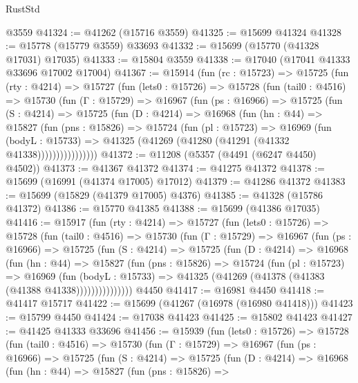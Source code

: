 \begin{lexlean}{RustStd}
\begin{coremodule}
    @3559
@41324 := @41262 (@15716 @3559)
@41325 := @15699 @41324
@41328 := @15778 (@15779 @3559) @33693
@41332 := @15699 (@15770 (@41328 @17031) @17035)
@41333 := @15804 @3559
@41338 := @17040 (@17041 @41333 @33696 @17002 @17004)
@41367 := @15914
    (fun (rc : @15723) =>
    @15725
      (fun (rty : @4214) =>
      @15727
        (fun (lets0 : @15726) =>
        @15728
          (fun (tail0 : @4516) =>
          @15730
            (fun (Γ : @15729) =>
            @16967
              (fun (ps : @16966) =>
              @15725
                (fun (S : @4214) =>
                @15725
                  (fun (D : @4214) =>
                  @16968
                    (fun (hn : @44) =>
                    @15827
                      (fun (pns : @15826) =>
                      @15724
                        (fun (pl : @15723) =>
                        @16969
                          (fun (bodyL : @15733) =>
                          @41325 (@41269 (@41280 (@41291 (@41332 @41338))))))))))))))))
@41372 := @11208 (@5357 (@4491 (@6247 @4450) @4502))
@41373 := @41367 @41372
@41374 := @41275 @41372
@41378 := @15699 (@16991 (@41374 @17005) @17012)
@41379 := @41286 @41372
@41383 := @15699 (@15829 (@41379 @17005) @4376)
@41385 := @41328 (@15786 @41372)
@41386 := @15770 @41385
@41388 := @15699 (@41386 @17035)
@41416 := @15917
    (fun (rty : @4214) =>
    @15727
      (fun (lets0 : @15726) =>
      @15728
        (fun (tail0 : @4516) =>
        @15730
          (fun (Γ : @15729) =>
          @16967
            (fun (ps : @16966) =>
            @15725
              (fun (S : @4214) =>
              @15725
                (fun (D : @4214) =>
                @16968
                  (fun (hn : @44) =>
                  @15827
                    (fun (pns : @15826) =>
                    @15724
                      (fun (pl : @15723) =>
                      @16969
                        (fun (bodyL : @15733) =>
                        @41325 (@41269 (@41378 (@41383 (@41388 @41338)))))))))))))))
    @4450
@41417 := @16981 @4450
@41418 := @41417 @15717
@41422 := @15699 (@41267 (@16978 (@16980 @41418)))
@41423 := @15799 @4450
@41424 := @17038 @41423
@41425 := @15802 @41423
@41427 := @41425 @41333 @33696
@41456 := @15939
    (fun (lets0 : @15726) =>
    @15728
      (fun (tail0 : @4516) =>
      @15730
        (fun (Γ : @15729) =>
        @16967
          (fun (ps : @16966) =>
          @15725
            (fun (S : @4214) =>
            @15725
              (fun (D : @4214) =>
              @16968
                (fun (hn : @44) =>
                @15827
                  (fun (pns : @15826) =>

\end{coremodule}
\end{lexlean}
